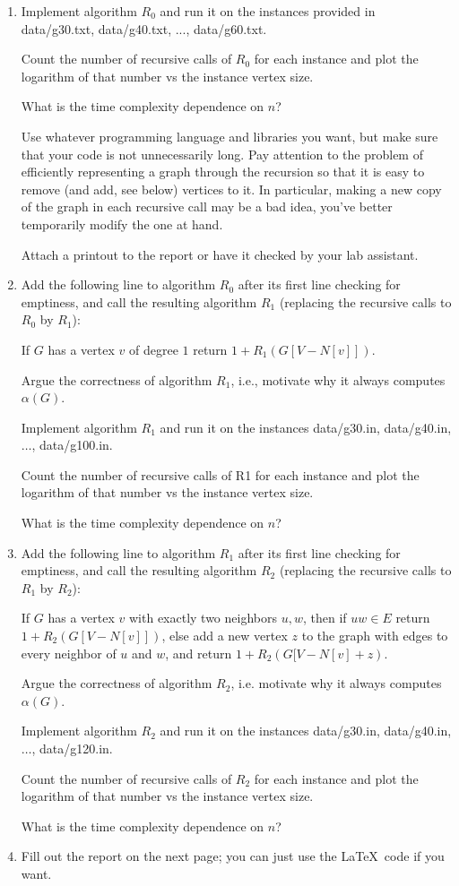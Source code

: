 \documentclass{tufte-handout}
\begin{document}
\begin{enumerate}
\item Implement algorithm $R_0$ and run it on the instances provided in
  data/g30.txt, data/g40.txt, ..., data/g60.txt.
  
  Count the number of recursive calls of $R_0$ for each instance and plot the
  logarithm of that number vs the instance vertex size. 
  
  What is the time complexity dependence on $n$?
  
  Use whatever programming language and libraries you want, but make
  sure that your code is not unnecessarily long.
  Pay attention to the problem of efficiently representing a graph
  through the recursion so that it is easy to remove (and add, see
  below) vertices to it.
  In particular, making a new copy of the graph in each recursive call
  may be a bad idea, you've better temporarily modify the one at hand.
   
  Attach a printout to the report or have it checked by your lab
  assistant.
\item Add the following line to algorithm $R_0$ after its first line
  checking for emptiness, and call the resulting algorithm $R_1$
  (replacing the recursive calls to $R_0$ by $R_1$):
 
 If $G$ has a vertex $v$ of degree $1$ return $1+R_1(G[V-N[v]])$.
 
 Argue the correctness of algorithm $R_1$, i.e., motivate why it always computes $\alpha(G)$.
 
 Implement algorithm $R_1$ and run it on the instances data/g30.in,
 data/g40.in, $\ldots$, data/g100.in.

  Count the number of recursive calls of R1 for each instance and plot the
  logarithm of that number vs the instance vertex size. 
  
  What is the time complexity dependence on $n$?

\item Add the following line to algorithm $R_1$ after its first line
  checking for emptiness, and call the resulting algorithm $R_2$
  (replacing the recursive calls to $R_1$ by $R_2$):
 
  If $G$ has a vertex $v$ with exactly two neighbors $u,w$, then if
  $uw\in E$ return $1+R_2(G[V-N[v]])$, else add a new vertex $z$ to
  the graph with edges to every neighbor of $u$ and $w$, and return
  $1+R_2(G[V-N[v]+z)$.
 
 Argue the correctness of algorithm $R_2$, i.e. motivate why it always computes $\alpha(G)$.
 
 Implement algorithm $R_2$ and run it on the instances
  data/g30.in, data/g40.in, $\ldots$, data/g120.in.

  Count the number of recursive calls of $R_2$ for each instance and plot the
  logarithm of that number vs the instance vertex size. 
  
  What is the time complexity dependence on $n$?

\item Fill out the report on the next page; you can just use the
  \LaTeX\ code if you want.
\end{enumerate}
\end{document}
